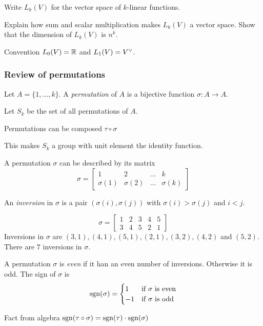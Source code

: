\begin{frame}
  Write $L_k(V)$ for the vector space of $k$-linear functions.
  \begin{exercise}
    Explain how sum and scalar multiplication makes $L_k(V)$ a vector space.
    Show that the dimension of $L_k(V)$ is $n^k$.
  \end{exercise}
  Convention $L_0(V) = \mathbb R$ and $L_1(V) = V^\vee$.
\end{frame}
\begin{frame}
  \frametitle{Review of permutations}
  Let $A = \{1, \dots, k\}$. A {\em permutation} of $A$ is a bijective 
  function $\sigma \colon A \to A$.

  Let $S_k$ be the set of all permutations
  of $A$.

  Permutations can be composed $\tau \circ \sigma$

  This makes $S_k$ a group with unit element the identity function.

  A permutation $\sigma$ can be described by its matrix
  \begin{displaymath}
    \sigma = 
    \begin{bmatrix}
      1 & 2 & \dots & k \\
      \sigma(1) & \sigma(2) & \dots & \sigma(k)
    \end{bmatrix}
  \end{displaymath}
\end{frame}
\begin{frame}
  An {\em inversion} in $\sigma$ is a pair $(\sigma(i), \sigma(j))$ with
  $\sigma(i) > \sigma(j)$ and $i < j$.
  \begin{example}
  \begin{displaymath}
    \sigma = 
    \begin{bmatrix}
      1 & 2 & 3 & 4 & 5 \\
      3 & 4 & 5 & 2 & 1
    \end{bmatrix}
  \end{displaymath}
    Inversions in $\sigma$ are $(3, 1), (4, 1), (5, 1), (2,1), (3, 2), (4, 2)$
    and
    $(5, 2)$. There are $7$ inversions in $\sigma$.
  \end{example}
  \begin{defn}
    A permutation $\sigma$ is {\em even} if it han an even number of
    inversions. Otherwise it is odd.
    The sign of $\sigma$ is
    \begin{displaymath}
      \operatorname{sgn}(\sigma) = 
      \begin{cases}
        1 & \text{if $\sigma$ is even} \\
        -1 & \text{if $\sigma$ is odd}
      \end{cases}
    \end{displaymath}
  \end{defn}
  \begin{block}
    {Fact from algebra}
    $\operatorname{sgn}(\tau \circ \sigma) = \operatorname{sgn}(\tau) \cdot \operatorname{sgn}(\sigma)$
  \end{block}
\end{frame}
